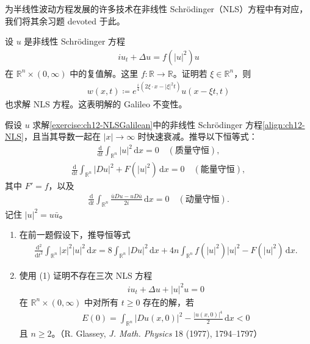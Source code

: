 \documentclass[../../main.tex]{subfiles}
\begin{document}
为半线性波动方程发展的许多技术在非线性 Schr\"odinger（NLS）方程中有对应，我们将其余习题 devoted 于此。

\begin{exercise}\label{exercise:ch12-NLSGalilean}
设 $u$ 是非线性 Schr\"odinger 方程
\begin{align}
iu_t+\Delta u=f(|u|^2)u
\label{align:ch12-NLS}
\end{align}
在 $\mathbb{R}^n\times(0,\infty)$ 中的复值解。这里 $f:\mathbb{R}\to\mathbb{R}$。证明若 $\xi\in\mathbb{R}^n$，则
\begin{align*}
w(x,t)\coloneqq e^{\frac{i}{4}(2\xi\cdot x-|\xi|^2t)}u(x-\xi t,t)
\end{align*}
也求解 NLS 方程。这表明解的 Galileo 不变性。
\end{exercise}

\begin{exercise}\label{exercise:ch12-NLS守恒}
假设 $u$ 求解\cref{exercise:ch12-NLSGalilean}中的非线性 Schr\"odinger 方程\eqref{align:ch12-NLS}，且当其导数一起在 $|x|\to\infty$ 时快速衰减。推导以下恒等式：
\begin{align*}
\frac{\mathrm{d}}{\mathrm{d}t}\int_{\mathbb{R}^n}|u|^2\,\mathrm{d}x=0 \quad (\text{质量守恒}),
\end{align*}
\begin{align*}
\frac{\mathrm{d}}{\mathrm{d}t}\int_{\mathbb{R}^n}|Du|^2+F(|u|^2)\,\mathrm{d}x=0 \quad (\text{能量守恒}),
\end{align*}
其中 $F'=f$，以及
\begin{align*}
\frac{\mathrm{d}}{\mathrm{d}t}\int_{\mathbb{R}^n}\frac{\bar{u}Du-uD\bar{u}}{2i}\,\mathrm{d}x=0 \quad (\text{动量守恒}).
\end{align*}
记住 $|u|^2=u\bar{u}$。
\end{exercise}

\begin{exercise}[续上题。]\label{exercise:ch12-NLS爆破}
\begin{enumerate}[(1)]
\item 在前一题假设下，推导恒等式
\begin{align*}
\frac{\mathrm{d}^2}{\mathrm{d}t^2}\int_{\mathbb{R}^n}|x|^2|u|^2\,\mathrm{d}x=8\int_{\mathbb{R}^n}|Du|^2\,\mathrm{d}x+4n\int_{\mathbb{R}^n}f(|u|^2)|u|^2-F(|u|^2)\,\mathrm{d}x.
\end{align*}
\item 使用 (1) 证明不存在三次 NLS 方程
\begin{align*}
iu_t+\Delta u+|u|^2u=0
\end{align*}
在 $\mathbb{R}^n\times(0,\infty)$ 中对所有 $t\geqslant 0$ 存在的解，若
\begin{align*}
E(0)=\int_{\mathbb{R}^n}|Du(x,0)|^2-\frac{|u(x,0)|^4}{2}\,\mathrm{d}x<0
\end{align*}
且 $n\geqslant 2$。（R. Glassey, \textit{J. Math. Physics} 18 (1977), 1794--1797）
\end{enumerate}
\end{exercise}
\end{document}
